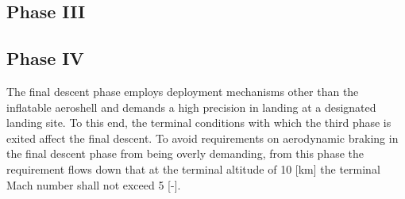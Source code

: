 \subsection{Phase III}\label{sec:p3}

\subsection{Phase IV}\label{sec:p4}
The final descent phase employs deployment mechanisms other than the inflatable aeroshell and demands a high precision in landing at a designated landing site. To this end, the terminal conditions with which the third phase is exited affect the final descent. To avoid requirements on aerodynamic braking in the final descent phase from being overly demanding, from this phase the requirement flows down that at the terminal altitude of 10 [km] the terminal Mach number shall not exceed 5 [-]. 

